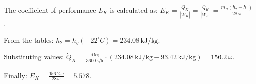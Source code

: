 The coefficient of performance \( E_K \) is calculated as:  
\( E_K = \frac{\dot{Q}_K}{|\dot{W}_K|} = \frac{\dot{Q}_K}{|\dot{W}_K|} = \frac{m_R(h_2 - h_1)}{28 \, \omega} \).  

From the tables:  
\( h_2 = h_g(-22^\circ C) = 234.08 \, \text{kJ/kg} \).  

Substituting values:  
\( \dot{Q}_K = \frac{4 \, \text{kg}}{3600 \, \text{s/h}} \cdot (234.08 \, \text{kJ/kg} - 93.42 \, \text{kJ/kg}) = 156.2 \, \omega \).  

Finally:  
\( E_K = \frac{156.2 \, \omega}{28 \, \omega} = 5.578 \).